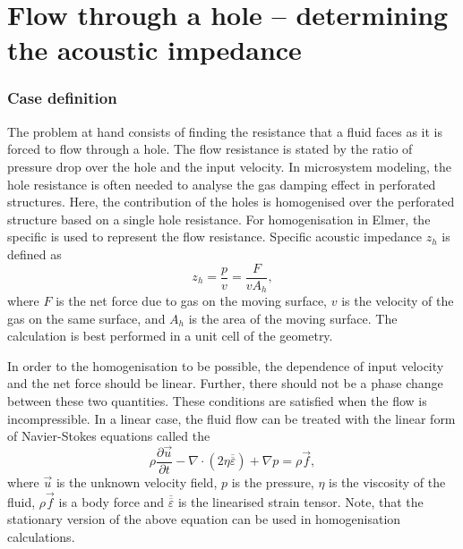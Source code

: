 \chapter{Flow through a hole -- determining the acoustic impedance} 


\subsection*{Case definition}

The problem at hand consists of finding the resistance that a fluid
faces as it is forced to flow through a hole. The flow resistance is
stated by the ratio of pressure drop over the hole and the input
velocity. In microsystem modeling, the hole resistance is often needed
to analyse the gas damping effect in perforated structures. Here, the
contribution of the holes is homogenised over the perforated structure
based on a single hole resistance. For homogenisation in Elmer, the
specific  is used to represent the flow
resistance. Specific acoustic impedance $z_h$ is defined as
\begin{equation}
z_h = \frac{p}{v} = \frac{F}{vA_h},
\end{equation}
where $F$ is the net force due to gas on the moving surface, $v$ is
the velocity of the gas on the same surface, and $A_h$ is the area of
the moving surface. The calculation is best performed in a unit cell
of the geometry.

In order to the homogenisation to be possible, the dependence of input
velocity and the net force should be linear. Further, there should not
be a phase change between these two quantities. These conditions are
satisfied when the flow is incompressible.  In a linear case, the
fluid flow can be treated with the linear form of Navier-Stokes
equations called the 
\begin{equation}
\rho\frac{\partial \vec{u}}{\partial t}
-\nabla\cdot(2\eta\overline{\overline{\varepsilon}}) +\nabla p =
\rho \vec{f},
\end{equation}
where $\vec{u}$ is the unknown velocity field, $p$ is the pressure,
$\eta$ is the viscosity of the fluid, $\rho\vec{f}$ is a body force
and $\overline{\overline{\varepsilon}}$ is the linearised strain
tensor. Note, that the stationary version of the above equation can be
used in homogenisation calculations.

